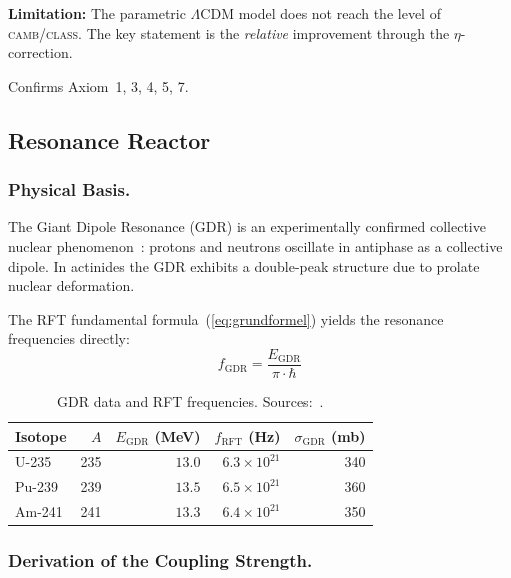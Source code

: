 \documentclass[12pt]{iopart}
\begin{document}
	\noindent
	\textbf{Limitation:} The parametric $\Lambda$CDM model
	does not reach the level of \textsc{camb}/\textsc{class}.
	The key statement is the \textit{relative} improvement
	through the $\eta$-correction.
	
	Confirms Axiom~1, 3, 4, 5, 7.
	
	\subsection{Resonance Reactor}
	\label{sec:resonanzreaktor}
	
	\subsubsection{Physical Basis.}
	
	The Giant Dipole Resonance (GDR) is an experimentally
	confirmed collective nuclear
	phenomenon~\cite{gdr_atlas, ishkhanov2021}:
	protons and neutrons oscillate in antiphase as a
	collective dipole. In actinides the GDR exhibits a
	double-peak structure due to prolate nuclear deformation.
	
	The RFT fundamental formula~(\ref{eq:grundformel}) yields
	the resonance frequencies directly:
	\begin{equation}
		f_{\mathrm{GDR}} =
		\frac{E_{\mathrm{GDR}}}{\pi \cdot \hbar}
		\label{eq:f_gdr}
	\end{equation}
	
	\begin{table}[ht]
		\centering
		\caption{GDR data and RFT frequencies.
			Sources:~\cite{gdr_atlas, ishkhanov2021,
				ripl3}.}
		\label{tab:gdr}
		\begin{tabular}{lrrrr}
			\hline
			Isotope & $A$
			& $E_{\mathrm{GDR}}$ (MeV)
			& $f_{\mathrm{RFT}}$ (Hz)
			& $\sigma_{\mathrm{GDR}}$ (mb) \\
			\hline
			U-235 & 235 & $13.0$
			& $6.3 \times 10^{21}$ & 340 \\
			Pu-239 & 239 & $13.5$
			& $6.5 \times 10^{21}$ & 360 \\
			Am-241 & 241 & $13.3$
			& $6.4 \times 10^{21}$ & 350 \\
			\hline
		\end{tabular}
	\end{table}
	
	\subsubsection{Derivation of the Coupling Strength.}
	
\end{document}

